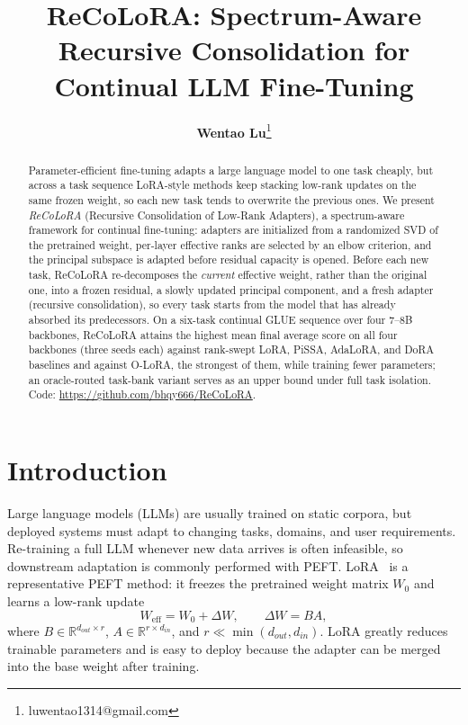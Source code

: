 \documentclass[11pt]{article}
\title{\textbf{ReCoLoRA}: Spectrum-Aware Recursive Consolidation for Continual LLM Fine-Tuning}
\author{\textbf{Wentao Lu}\thanks{luwentao1314@gmail.com}}
\begin{document}
\maketitle

\begin{abstract}
Parameter-efficient fine-tuning adapts a large language model to one task cheaply, but across a task sequence LoRA-style methods keep stacking low-rank updates on the same frozen weight, so each new task tends to overwrite the previous ones. We present \emph{ReCoLoRA} (Recursive Consolidation of Low-Rank Adapters), a spectrum-aware framework for continual fine-tuning: adapters are initialized from a randomized SVD of the pretrained weight, per-layer effective ranks are selected by an elbow criterion, and the principal subspace is adapted before residual capacity is opened. Before each new task, ReCoLoRA re-decomposes the \emph{current} effective weight, rather than the original one, into a frozen residual, a slowly updated principal component, and a fresh adapter (recursive consolidation), so every task starts from the model that has already absorbed its predecessors. On a six-task continual GLUE sequence over four 7--8B backbones, ReCoLoRA attains the highest mean final average score on all four backbones (three seeds each) against rank-swept LoRA, PiSSA, AdaLoRA, and DoRA baselines and against O-LoRA, the strongest of them, while training fewer parameters; an oracle-routed task-bank variant serves as an upper bound under full task isolation. Code: \url{https://github.com/bhqy666/ReCoLoRA}.
\end{abstract}

\section{Introduction}
Large language models (LLMs) are usually trained on static corpora, but deployed systems must adapt to changing tasks, domains, and user requirements. Re-training a full LLM whenever new data arrives is often infeasible, so downstream adaptation is commonly performed with PEFT. LoRA~\cite{hu2022lora} is a representative PEFT method: it freezes the pretrained weight matrix $W_0$ and learns a low-rank update
\begin{equation}
    W_{\mathrm{eff}} = W_0 + \Delta W, \qquad \Delta W = BA,
\end{equation}
where $B \in \mathbb{R}^{d_{out}\times r}$, $A \in \mathbb{R}^{r\times d_{in}}$, and $r \ll \min(d_{out}, d_{in})$. LoRA greatly reduces trainable parameters and is easy to deploy because the adapter can be merged into the base weight after training.
\end{document}
